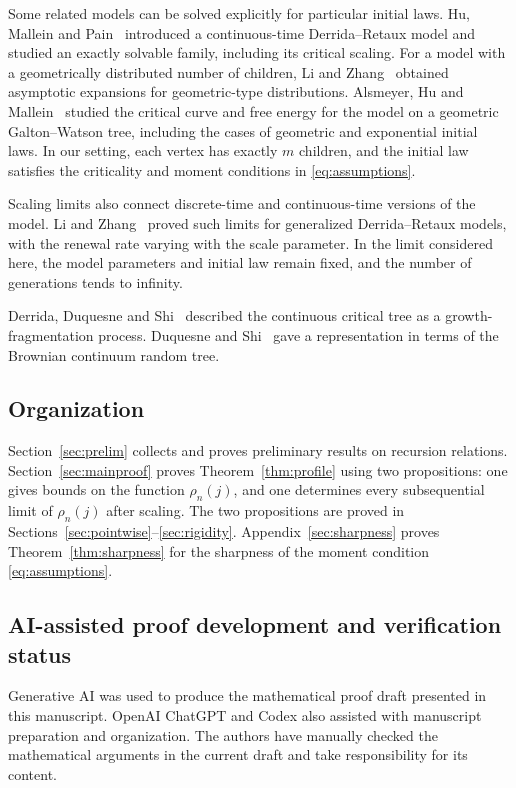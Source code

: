 \documentclass[11pt,letterpaper,reqno]{amsart}
\numberwithin{equation}{section}
\theoremstyle{plain}
\theoremstyle{remark}
\begin{document}
Some related models can be solved explicitly for particular initial laws. Hu, Mallein and Pain~\cite{HMP} introduced a continuous-time Derrida--Retaux model and studied an exactly solvable family, including its critical scaling. For a model with a geometrically distributed number of children, Li and Zhang~\cite{LZ} obtained asymptotic expansions for geometric-type distributions. Alsmeyer, Hu and Mallein~\cite{AHM} studied the critical curve and free energy for the model on a geometric Galton--Watson tree, including the cases of geometric and exponential initial laws. In our setting, each vertex has exactly $m$ children, and the initial law satisfies the criticality and moment conditions in \eqref{eq:assumptions}.

Scaling limits also connect discrete-time and continuous-time versions of the model. Li and Zhang~\cite{LZscale} proved such limits for generalized Derrida--Retaux models, with the renewal rate varying with the scale parameter. In the limit considered here, the model parameters and initial law remain fixed, and the number of generations tends to infinity.

Derrida, Duquesne and Shi~\cite{DDS} described the continuous critical tree as a growth-fragmentation process. Duquesne and Shi~\cite{DuS} gave a representation in terms of the Brownian continuum random tree.

\subsection{Organization}
Section~\ref{sec:prelim} collects and proves preliminary results on recursion relations. Section~\ref{sec:mainproof} proves Theorem~\ref{thm:profile} using two propositions: one gives bounds on the function $\rho_n(j)$, and one determines every subsequential limit of $\rho_{n}(j)$ after scaling. The two propositions are proved in Sections~\ref{sec:pointwise}--\ref{sec:rigidity}. Appendix~\ref{sec:sharpness} proves Theorem~\ref{thm:sharpness} for the sharpness of the moment condition \eqref{eq:assumptions}.

\subsection{AI-assisted proof development and verification status}
\label{subsec:ai-declaration}

Generative AI was used to produce the mathematical proof draft presented
in this manuscript. OpenAI ChatGPT and Codex also assisted with manuscript
preparation and organization. The authors have manually checked the
mathematical arguments in the current draft and take responsibility for
its content.
\end{document}

